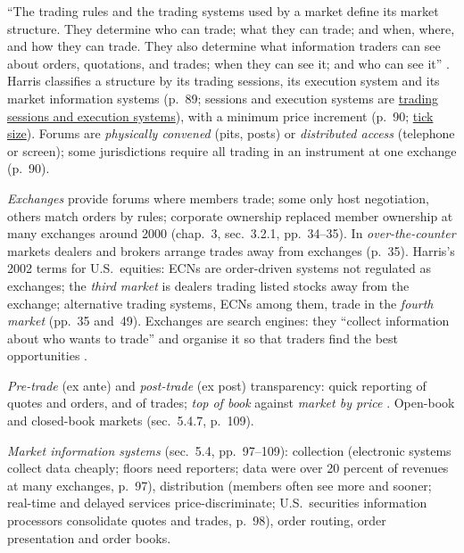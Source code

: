 \begin{qfdefinition}\label{def:market-structures-venues}
 ``The trading rules and the trading systems used by a market define its market structure. They determine who can trade; what they can trade; and when, where, and how they can trade. They also determine what information traders can see about orders, quotations, and trades; when they can see it; and who can see it'' \citep[chap.~5, p.~89]{alpha-harris}. Harris classifies a structure by its trading sessions, its execution system and its market information systems (p.~89; sessions and execution systems are \hyperref[def:trading-sessions-execution-systems]{trading sessions and execution systems}), with a minimum price increment (p.~90; \hyperref[def:tick-size]{tick size}). Forums are \emph{physically convened} (pits, posts) or \emph{distributed access} (telephone or screen); some jurisdictions require all trading in an instrument at one exchange (p.~90).

\emph{Exchanges} provide forums where members trade; some only host negotiation, others match orders by rules; corporate ownership replaced member ownership at many exchanges around 2000 (chap.~3, sec.~3.2.1, pp.~34--35). In \emph{over-the-counter} markets dealers and brokers arrange trades away from exchanges (p.~35). Harris's 2002 terms for U.S.\ equities: ECNs are order-driven systems not regulated as exchanges; the \emph{third market} is dealers trading listed stocks away from the exchange; alternative trading systems, ECNs among them, trade in the \emph{fourth market} (pp.~35 and~49). Exchanges are search engines: they ``collect information about who wants to trade'' and organise it so that traders find the best opportunities \citep[chap.~19, box, p.~396]{alpha-harris}.

 \emph{Pre-trade} (ex ante) and \emph{post-trade} (ex post) transparency: quick reporting of quotes and orders, and of trades; \emph{top of book} against \emph{market by price} \citep[chap.~5, sec.~5.4.4, p.~101]{alpha-harris}. Open-book and closed-book markets (sec.~5.4.7, p.~109).

 \emph{Market information systems} (sec.~5.4, pp.~97--109): collection (electronic systems collect data cheaply; floors need reporters; data were over 20 percent of revenues at many exchanges, p.~97), distribution (members often see more and sooner; real-time and delayed services price-discriminate; U.S.\ securities information processors consolidate quotes and trades, p.~98), order routing, order presentation and order books.


\end{qfdefinition}
